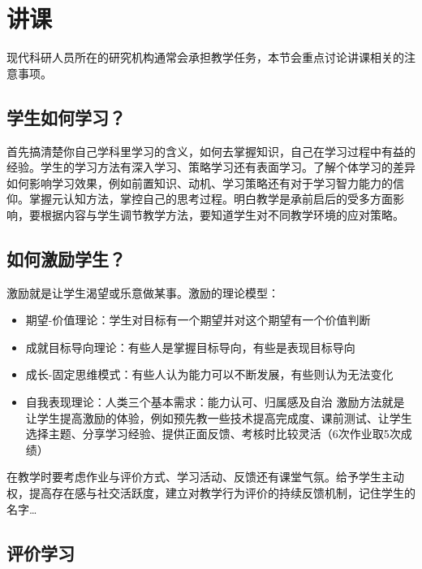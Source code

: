 \documentclass[]{tufte-book}
\providecommand{\tightlist}{%
  \setlength{\itemsep}{0pt}\setlength{\parskip}{0pt}}
\begin{document}
\hypertarget{ux8bb2ux8bfe}{%
\section{讲课}\label{ux8bb2ux8bfe}}

现代科研人员所在的研究机构通常会承担教学任务，本节会重点讨论讲课相关的注意事项。

\hypertarget{ux5b66ux751fux5982ux4f55ux5b66ux4e60}{%
\subsection{学生如何学习？}\label{ux5b66ux751fux5982ux4f55ux5b66ux4e60}}

首先搞清楚你自己学科里学习的含义，如何去掌握知识，自己在学习过程中有益的经验。学生的学习方法有深入学习、策略学习还有表面学习。了解个体学习的差异如何影响学习效果，例如前置知识、动机、学习策略还有对于学习智力能力的信仰。掌握元认知方法，掌控自己的思考过程。明白教学是承前启后的受多方面影响，要根据内容与学生调节教学方法，要知道学生对不同教学环境的应对策略。

\hypertarget{ux5982ux4f55ux6fc0ux52b1ux5b66ux751f}{%
\subsection{如何激励学生？}\label{ux5982ux4f55ux6fc0ux52b1ux5b66ux751f}}

激励就是让学生渴望或乐意做某事。激励的理论模型：

\begin{itemize}
\tightlist
\item
  期望-价值理论：学生对目标有一个期望并对这个期望有一个价值判断
\item
  成就目标导向理论：有些人是掌握目标导向，有些是表现目标导向
\item
  成长-固定思维模式：有些人认为能力可以不断发展，有些则认为无法变化
\item
  自我表现理论：人类三个基本需求：能力认可、归属感及自治
  激励方法就是让学生提高激励的体验，例如预先教一些技术提高完成度、课前测试、让学生选择主题、分享学习经验、提供正面反馈、考核时比较灵活（6次作业取5次成绩）
\end{itemize}

在教学时要考虑作业与评价方式、学习活动、反馈还有课堂气氛。给予学生主动权，提高存在感与社交活跃度，建立对教学行为评价的持续反馈机制，记住学生的名字\ldots{}

\hypertarget{ux8bc4ux4ef7ux5b66ux4e60}{%
\subsection{评价学习}\label{ux8bc4ux4ef7ux5b66ux4e60}}
\end{document}
